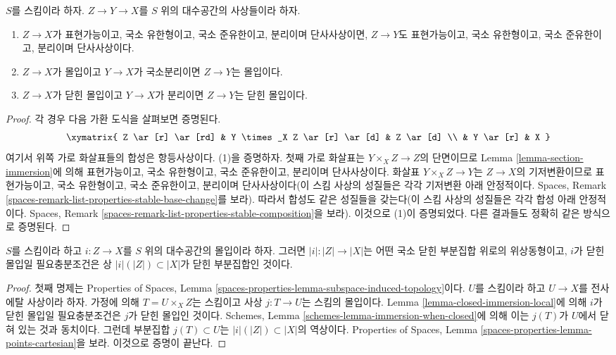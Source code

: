 \begin{lemma}
\label{lemma-immersion-permanence}
$S$를 스킴이라 하자.
$Z \to Y \to X$를 $S$ 위의 대수공간의 사상들이라 하자.
\begin{enumerate}
\item $Z \to X$가 표현가능이고, 국소 유한형이고, 국소 준유한이고,
분리이며 단사사상이면, $Z \to Y$도 표현가능이고, 국소 유한형이고,
국소 준유한이고, 분리이며 단사사상이다.
\item $Z \to X$가 몰입이고 $Y \to X$가 국소분리이면
$Z \to Y$는 몰입이다.
\item $Z \to X$가 닫힌 몰입이고 $Y \to X$가 분리이면
$Z \to Y$는 닫힌 몰입이다.
\end{enumerate}
\end{lemma}

\begin{proof}
각 경우 다음 가환 도식을 살펴보면 증명된다.
$$
\xymatrix{
Z \ar[r] \ar[rd] & Y \times_X Z \ar[r] \ar[d] & Z \ar[d] \\
& Y \ar[r] & X
}
$$
여기서 위쪽 가로 화살표들의 합성은 항등사상이다.
(1)을 증명하자. 첫째 가로 화살표는 $Y \times_X Z \to Z$의 단면이므로
Lemma \ref{lemma-section-immersion}에 의해 표현가능이고,
국소 유한형이고, 국소 준유한이고, 분리이며 단사사상이다.
화살표 $Y \times_X Z \to Y$는 $Z \to X$의 기저변환이므로
표현가능이고, 국소 유한형이고, 국소 준유한이고, 분리이며
단사사상이다(이 스킴 사상의 성질들은 각각 기저변환 아래 안정적이다.
Spaces, Remark \ref{spaces-remark-list-properties-stable-base-change}를 보라).
따라서 합성도 같은 성질들을 갖는다(이 스킴 사상의 성질들은 각각
합성 아래 안정적이다. Spaces, Remark
\ref{spaces-remark-list-properties-stable-composition}을 보라).
이것으로 (1)이 증명되었다. 다른 결과들도 정확히 같은 방식으로 증명된다.
\end{proof}

\begin{lemma}
\label{lemma-immersion-when-closed}
$S$를 스킴이라 하고 $i : Z \to X$를 $S$ 위의 대수공간의 몰입이라 하자.
그러면 $|i| : |Z| \to |X|$는 어떤 국소 닫힌 부분집합 위로의
위상동형이고, $i$가 닫힌 몰입일 필요충분조건은 상
$|i|(|Z|) \subset |X|$가 닫힌 부분집합인 것이다.
\end{lemma}

\begin{proof}
첫째 명제는 Properties of Spaces, Lemma
\ref{spaces-properties-lemma-subspace-induced-topology}이다.
$U$를 스킴이라 하고 $U \to X$를 전사 에탈 사상이라 하자.
가정에 의해 $T = U \times_X Z$는 스킴이고 사상 $j : T \to U$는
스킴의 몰입이다. Lemma \ref{lemma-closed-immersion-local}에 의해
$i$가 닫힌 몰입일 필요충분조건은 $j$가 닫힌 몰입인 것이다.
Schemes, Lemma \ref{schemes-lemma-immersion-when-closed}에 의해 이는
$j(T)$가 $U$에서 닫혀 있는 것과 동치이다.
그런데 부분집합 $j(T) \subset U$는
$|i|(|Z|) \subset |X|$의 역상이다. Properties of Spaces, Lemma
\ref{spaces-properties-lemma-points-cartesian}을 보라.
이것으로 증명이 끝난다.
\end{proof}


